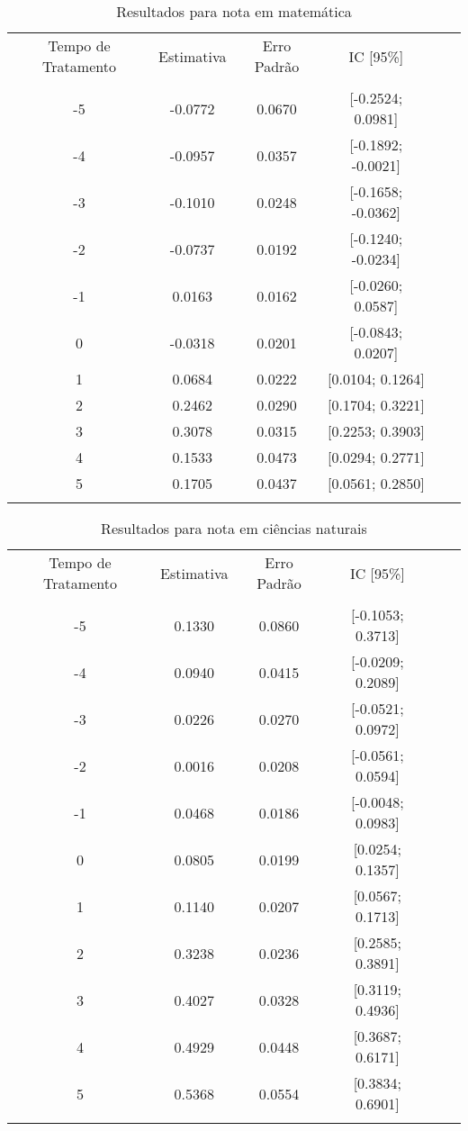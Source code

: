 \documentclass[
        12pt,                           %
        openright,                      %
        oneside,
        a4paper,                        %
        chapter=TITLE,         %
        section=TITLE,         %
        subsection=Title,      %
        english,                        %
        spanish,                        %
        portugues,                      %
        ]{abntex2}
\begin{document}
{\begin{apendicesenv}
\begin{table}[htbp]
\caption{Resultados para nota em matemática}
\centering
\begin{tabular}{cccccc}
\\ \hline
Tempo de Tratamento & Estimativa & Erro Padrão & IC [95\%] \\
\\ \hline
-5 & -0.0772 & 0.0670 & [-0.2524; 0.0981] \\
-4 & -0.0957 & 0.0357 & [-0.1892; -0.0021] \\
-3 & -0.1010 & 0.0248 & [-0.1658; -0.0362] \\
-2 & -0.0737 & 0.0192 & [-0.1240; -0.0234] \\
-1 & 0.0163 & 0.0162 & [-0.0260; 0.0587] \\
0 & -0.0318 & 0.0201 & [-0.0843; 0.0207] \\
1 & 0.0684 & 0.0222 & [0.0104; 0.1264] \\
2 & 0.2462 & 0.0290 & [0.1704; 0.3221] \\
3 & 0.3078 & 0.0315 & [0.2253; 0.3903] \\
4 & 0.1533 & 0.0473 & [0.0294; 0.2771] \\
5 & 0.1705 & 0.0437 & [0.0561; 0.2850] \\
\\ \hline
\end{tabular}
\label{tab:resultados_matematica}
\end{table}

\begin{table}[htbp]
\caption{Resultados para nota em ciências naturais}
\centering
\begin{tabular}{cccccc}
\\ \hline
Tempo de Tratamento & Estimativa & Erro Padrão & IC [95\%] \\
\\ \hline
-5 & 0.1330 & 0.0860 & [-0.1053; 0.3713] \\
-4 & 0.0940 & 0.0415 & [-0.0209; 0.2089] \\
-3 & 0.0226 & 0.0270 & [-0.0521; 0.0972] \\
-2 & 0.0016 & 0.0208 & [-0.0561; 0.0594] \\
-1 & 0.0468 & 0.0186 & [-0.0048; 0.0983] \\
0 & 0.0805 & 0.0199 & [0.0254; 0.1357] \\
1 & 0.1140 & 0.0207 & [0.0567; 0.1713] \\
2 & 0.3238 & 0.0236 & [0.2585; 0.3891] \\
3 & 0.4027 & 0.0328 & [0.3119; 0.4936] \\
4 & 0.4929 & 0.0448 & [0.3687; 0.6171] \\
5 & 0.5368 & 0.0554 & [0.3834; 0.6901] \\
\\ \hline
\end{tabular}
\label{tab:resultados_ciencias}
\end{table}


\end{apendicesenv}}
\end{document}
